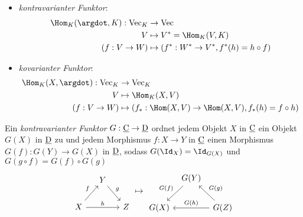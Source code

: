 \begin{ex}
	\begin{itemize}
		\item
			\emph{kontravarianter Funktor}:
			\begin{align*}
				\Hom_K(\argdot, K): \Vec_K &\to \Vec \\
				V &\mapsto V^* = \Hom_K(V,K) \\
				(f: V \to W) &\mapsto (f^*: W^* \to V^*, f^*(h) = h \circ f)
			\end{align*}
		\item
			\emph{kovarianter Funktor}:
			\begin{align*}
				\Hom_K(X, \argdot) : \Vec_K &\to \Vec_K \\
				V & \mapsto \Hom_K(X, V) \\
				(f: V \to W) & \mapsto (f_*: \Hom(X, V) \to \Hom(X, V), f_*(h) = f \circ h)
			\end{align*}
	\end{itemize}
\end{ex}

\begin{df}
	Ein \emph{kontravarianter Funktor} $G: \underline{\mathrm{C}} \to \underline{\mathrm{D}}$ ordnet jedem Objekt $X$ in $\underline{\mathrm{C}}$ ein Objekt $G(X)$ in $\underline{\mathrm{D}}$ zu und jedem Morphismus $f: X \to Y$ in $\underline{\mathrm{C}}$ einen Morphismus $G(f) : G(Y) \to G(X)$ in $\underline{\mathrm{D}}$, sodass $G(\Id_X) = \Id_{G(X)}$ und $G(g\circ f) = G(f) \circ G(g)$
	\[
		\begin{tikzcd}[column sep=small]
			~ & Y \arrow{dr}{g} & \\
			X \arrow{ur}{f} \arrow{rr}{h} & & Z
		\end{tikzcd}
		\mapsto
		\begin{tikzcd}[column sep=tiny]
			~ & G(Y) \arrow[leftarrow]{dr}{G(g)} & \\
			G(X) \arrow[leftarrow]{ur}{G(f)} \arrow[leftarrow]{rr}{G(h)} & & G(Z)
		\end{tikzcd}
	\]
\end{df}

